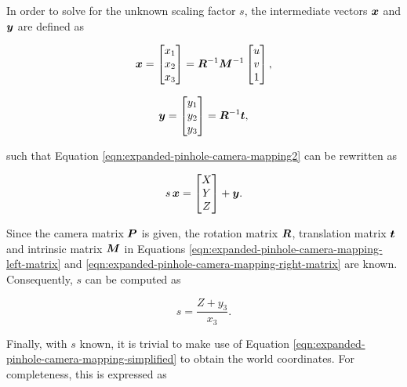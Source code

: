 In order to solve for the unknown scaling factor $s$, the intermediate vectors $\bm{x}$ and $\bm{y}$ are defined as

\begin{equation}
	\bm{x}=
	\begin{bmatrix}
		x_1 \\ 
		x_2 \\ 
		x_3
	\end{bmatrix}
=
	\bm{R}^{-1}\bm{M}^{-1}
	\begin{bmatrix}
		u \\ 
		v \\ 
		1
	\end{bmatrix},
	\label{eqn:expanded-pinhole-camera-mapping-left-matrix}
\end{equation}

\begin{equation}
	\bm{y}
	=
	\begin{bmatrix}
		y_1 \\ 
		y_2 \\ 
		y_3
	\end{bmatrix}
	=
	\bm{R}^{-1}\bm{t},
	\label{eqn:expanded-pinhole-camera-mapping-right-matrix}
\end{equation}

such that Equation \ref{eqn:expanded-pinhole-camera-mapping2} can be rewritten as

\begin{equation}
	s\,\bm{x}=
	\begin{bmatrix}
		X \\ 
		Y \\ 
		Z
	\end{bmatrix}
	+\bm{y}.
	\label{eqn:expanded-pinhole-camera-mapping-simplified}
\end{equation}

Since the camera matrix $\bm{P}$ is given, the rotation matrix $\bm{R}$, translation matrix $\bm{t}$ and intrinsic matrix $\bm{M}$ in Equations \ref{eqn:expanded-pinhole-camera-mapping-left-matrix} and \ref{eqn:expanded-pinhole-camera-mapping-right-matrix} are known. Consequently, $s$ can be computed as

\begin{equation}
	s=\frac{Z+y_3}{x_3}.
	\label{eqn:expanded-pinhole-camera-mapping-scaling-factor}
\end{equation}

Finally, with $s$ known, it is trivial to make use of Equation \ref{eqn:expanded-pinhole-camera-mapping-simplified} to obtain the world coordinates. For completeness, this is expressed as

